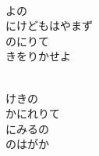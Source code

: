 \documentclass[10pt,b5j]{tarticle} %
\begin{document}
\begin{enumerate}
\begin{minipage}[c]{\blocksize}
    \end{minipage}
    \begin{minipage}[c]{\blocksize}
        
        \vspace{\linespace}
        \item~\\
        よの\\
        にけどもはやまず\\
        のにりて\\
        きをりかせよ
        
    \end{minipage}
    \begin{minipage}[c]{\blocksize}
        
        \vspace{\linespace}
        \item~\\
        けきの\\
        かにれりて\\
        にみるの\\
        のはがか
    
    \end{minipage}
\end{enumerate} %
\end{document}
